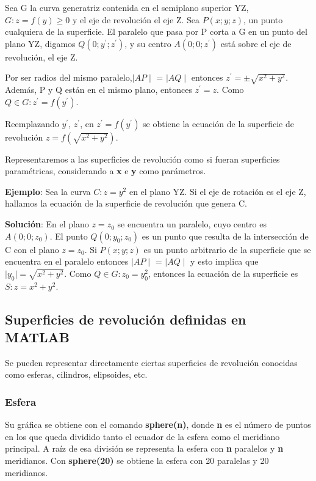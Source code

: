 Sea G la curva generatriz contenida en el semiplano superior YZ, $G : z = f(y) \geqslant 0 $ y el eje de revolución el eje Z. Sea $P(x;y;z)$, un punto cualquiera de la superficie. El paralelo que pasa por P corta a G en un punto del plano YZ, digamos $Q(0;y^{'};z^{'})$, y su centro $A(0;0;z^{'})$ está sobre el eje de revolución, el eje Z.

Por ser radios del mismo paralelo,$\mid AP \mid$ = $\mid AQ \mid$ entonces
$ z^{'}= \pm \sqrt{x^{2} + y^{2}}$. Además, P y Q están en el mismo plano, entonces $z^{'}=z$. Como $Q \in G : z^{'}=f(y^{'})$.

Reemplazando $y^{'}$, $z^{'}$, en $z^{'} = f(y^{'})$ se obtiene la ecuación de la superficie de revolución $z = f(\sqrt{x^{2} + y^{2}})$.

Representaremos a las superficies de revolución como si fueran superficies paramétricas, 
considerando a \textbf{x} e \textbf{y} como parámetros.

\textbf{Ejemplo}: Sea la curva $C : z = y^{2}$ en el plano YZ. Si el eje de rotación es el eje Z, hallamos la ecuación de la superficie de revolución que genera C.

\textbf{Solución}: En el plano $z=z_{0}$ se encuentra un paralelo, cuyo centro es $A(0;0;z_{0})$. El punto $Q(0;y_{0};z_{0})$ es un punto que resulta de la intersección de C con el plano $z=z_{0}$. Si $P(x;y;z)$ es un punto arbitrario de la superficie que se encuentra en el paralelo entonces $\mid AP \mid$ = $\mid AQ \mid$ y esto implica que $\mid y_{0} \mid = \sqrt{x^{2} + y^{2}}$. Como $Q \in G : z_{0} = y_{0}^{2}$, entonces la ecuación de la superficie es $ S : z = x^{2}+y^{2}$.

\subsection{Superficies de revolución definidas en MATLAB}

Se pueden representar directamente ciertas superficies de revolución conocidas como esferas, 
cilindros, elipsoides, etc.

\subsubsection{Esfera}

Su gráfica se obtiene con el comando \textbf{sphere(n)}, donde \textbf{n} es el número de puntos en los que queda dividido tanto el ecuador de la esfera como el meridiano principal. A raíz de esa división se representa la esfera con \textbf{n} paralelos y \textbf{n} meridianos. Con \textbf{sphere(20)} se obtiene la esfera con 20 paralelas y 20 meridianos.

